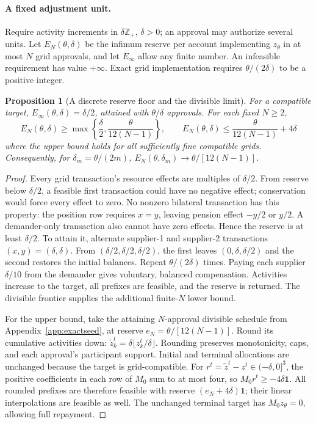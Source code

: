 \documentclass[ecta,draft,supplement]{econsocart}
\newtheorem{proposition}[theorem]{Proposition}
\theoremstyle{definition}
\theoremstyle{definition}
\begin{document}
\begin{appendix}
\paragraph{A fixed adjustment unit.}
Require activity increments in $\delta\mathbb Z_+$, $\delta>0$;
an approval may authorize several units. Let $E_N(\theta,\delta)$
be the infimum reserve per account implementing $z_\theta$ in at
most $N$ grid approvals, and let $E_\infty$ allow any finite number.
An infeasible requirement has value $+\infty$. Exact grid implementation
requires $\theta/(2\delta)$ to be a positive integer.

\begin{proposition}[A discrete reserve floor and the divisible limit]
\label{prop:gridreserve}
For a compatible target,
$E_\infty(\theta,\delta)=\delta/2$, attained with
$\theta/\delta$ approvals. For each fixed $N\geq2$,
\[
 E_N(\theta,\delta)\geq
 \max\left\{\frac\delta2,\frac{\theta}{12(N-1)}\right\},
 \qquad
 E_N(\theta,\delta)\leq\frac{\theta}{12(N-1)}+4\delta
\]
where the upper bound holds for all sufficiently fine compatible
grids. Consequently, for $\delta_m=\theta/(2m)$,
$E_N(\theta,\delta_m)\to\theta/[12(N-1)]$.
\end{proposition}

\begin{proof}
Every grid transaction's resource effects are multiples of
$\delta/2$. From reserve below $\delta/2$, a feasible first
transaction could have no negative effect; conservation would force
every effect to zero. No nonzero bilateral transaction has this
property: the position row requires $x=y$, leaving pension effect
$-y/2$ or $y/2$. A demander-only transaction also cannot have zero
effects. Hence the reserve is at least $\delta/2$.
To attain it, alternate supplier-1 and supplier-2 transactions
$(x,y)=(\delta,\delta)$. From $(\delta/2,\delta/2,\delta/2)$,
the first leaves $(0,\delta,\delta/2)$ and the second restores
the initial balances. Repeat $\theta/(2\delta)$ times. Paying
each supplier $\delta/10$ from the demander gives voluntary,
balanced compensation. Activities increase to the target, all
prefixes are feasible, and the reserve is returned. The divisible
frontier supplies the additional finite-$N$ lower bound.

For the upper bound, take the attaining $N$-approval divisible
schedule from Appendix~\ref{app:exactseed}, at reserve
$e_N=\theta/[12(N-1)]$. Round its cumulative activities down:
$\widetilde z_k^t=\delta\lfloor z_k^t/\delta\rfloor$.
Rounding preserves monotonicity, caps, and each approval's participant
support. Initial and terminal allocations are unchanged because the
target is grid-compatible. For
$r^t=\widetilde z^t-z^t\in(-\delta,0]^3$, the positive
coefficients in each row of $M_0$ sum to at most four, so
$M_0r^t\geq-4\delta\mathbf1$. All rounded prefixes are therefore
feasible with reserve $(e_N+4\delta)\mathbf1$; their linear
interpolations are feasible as well. The unchanged terminal target
has $M_0z_\theta=0$, allowing full repayment.


\end{proof}
\end{appendix}
\end{document}
